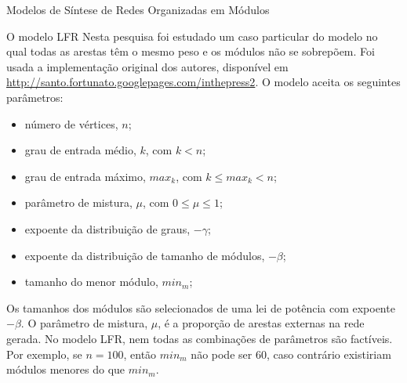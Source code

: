 \begin{section}{Modelos de Síntese de Redes Organizadas em Módulos}
\begin{subsection}{O modelo LFR}
Nesta pesquisa foi estudado um caso particular do modelo no qual todas as arestas têm o mesmo peso e os módulos não se sobrepõem. Foi usada a implementação original dos autores, disponível em  \url{http://santo.fortunato.googlepages.com/inthepress2}. O modelo aceita os seguintes parâmetros:

\begin{itemize}
\item número de vértices, $n$;
\item grau de entrada médio, $k$, com $k < n$;
\item grau de entrada máximo, $max_k$, com $k \le max_k < n$;
\item parâmetro de mistura, $\mu$, com $0 \le \mu \le 1$;
\item expoente da distribuição de graus, $-\gamma$;
\item expoente da distribuição de tamanho de módulos, $-\beta$;
\item tamanho do menor módulo, $min_m$;
\end{itemize}

Os tamanhos dos módulos são selecionados de uma lei de potência com expoente $-\beta$. O parâmetro de mistura, $\mu$, é a proporção de arestas externas na rede gerada. No modelo LFR, nem todas as combinações de parâmetros são factíveis. Por exemplo, se $n = 100$, então $min_m$ não pode ser 60, caso contrário existiriam módulos menores do que $min_m$.

\end{subsection}


\end{section}